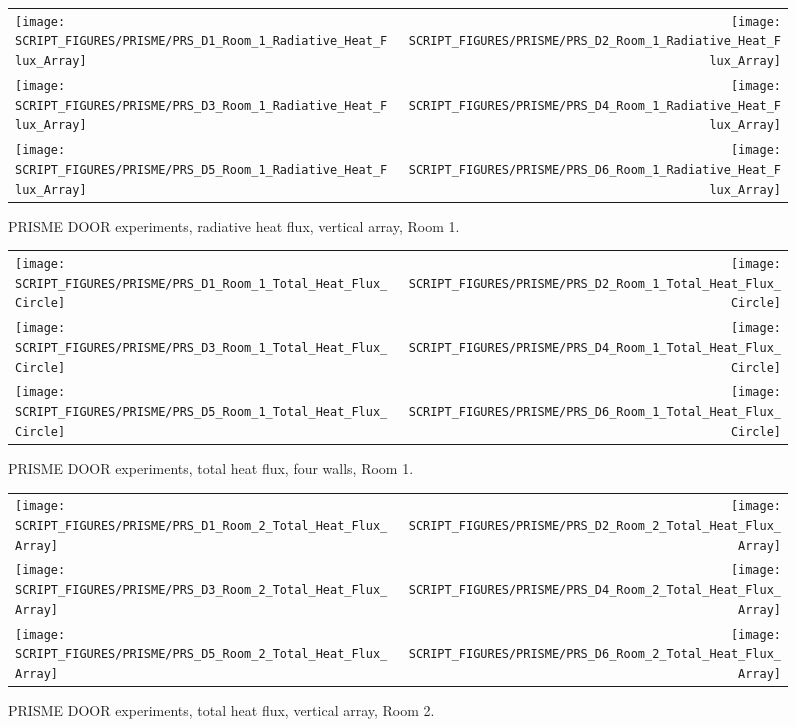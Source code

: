 \newpage

\begin{figure}[p]
\begin{tabular*}{\textwidth}{l@{\extracolsep{\fill}}r}
\texttt{[image: SCRIPT\_FIGURES/PRISME/PRS\_D1\_Room\_1\_Radiative\_Heat\_Flux\_Array]} &
\texttt{[image: SCRIPT\_FIGURES/PRISME/PRS\_D2\_Room\_1\_Radiative\_Heat\_Flux\_Array]} \\
\texttt{[image: SCRIPT\_FIGURES/PRISME/PRS\_D3\_Room\_1\_Radiative\_Heat\_Flux\_Array]} &
\texttt{[image: SCRIPT\_FIGURES/PRISME/PRS\_D4\_Room\_1\_Radiative\_Heat\_Flux\_Array]} \\
\texttt{[image: SCRIPT\_FIGURES/PRISME/PRS\_D5\_Room\_1\_Radiative\_Heat\_Flux\_Array]} &
\texttt{[image: SCRIPT\_FIGURES/PRISME/PRS\_D6\_Room\_1\_Radiative\_Heat\_Flux\_Array]}
\end{tabular*}
\caption{PRISME DOOR experiments, radiative heat flux, vertical array, Room 1.}
\label{PRISME_Wall_Array_RHF_Room_1}
\end{figure}

\begin{figure}[p]
\begin{tabular*}{\textwidth}{l@{\extracolsep{\fill}}r}
\texttt{[image: SCRIPT\_FIGURES/PRISME/PRS\_D1\_Room\_1\_Total\_Heat\_Flux\_Circle]} &
\texttt{[image: SCRIPT\_FIGURES/PRISME/PRS\_D2\_Room\_1\_Total\_Heat\_Flux\_Circle]} \\
\texttt{[image: SCRIPT\_FIGURES/PRISME/PRS\_D3\_Room\_1\_Total\_Heat\_Flux\_Circle]} &
\texttt{[image: SCRIPT\_FIGURES/PRISME/PRS\_D4\_Room\_1\_Total\_Heat\_Flux\_Circle]} \\
\texttt{[image: SCRIPT\_FIGURES/PRISME/PRS\_D5\_Room\_1\_Total\_Heat\_Flux\_Circle]} &
\texttt{[image: SCRIPT\_FIGURES/PRISME/PRS\_D6\_Room\_1\_Total\_Heat\_Flux\_Circle]}
\end{tabular*}
\caption{PRISME DOOR experiments, total heat flux, four walls, Room 1.}
\label{PRISME_Wall_Circle_THF_Room_1}
\end{figure}

\begin{figure}[p]
\begin{tabular*}{\textwidth}{l@{\extracolsep{\fill}}r}
\texttt{[image: SCRIPT\_FIGURES/PRISME/PRS\_D1\_Room\_2\_Total\_Heat\_Flux\_Array]} &
\texttt{[image: SCRIPT\_FIGURES/PRISME/PRS\_D2\_Room\_2\_Total\_Heat\_Flux\_Array]} \\
\texttt{[image: SCRIPT\_FIGURES/PRISME/PRS\_D3\_Room\_2\_Total\_Heat\_Flux\_Array]} &
\texttt{[image: SCRIPT\_FIGURES/PRISME/PRS\_D4\_Room\_2\_Total\_Heat\_Flux\_Array]} \\
\texttt{[image: SCRIPT\_FIGURES/PRISME/PRS\_D5\_Room\_2\_Total\_Heat\_Flux\_Array]} &
\texttt{[image: SCRIPT\_FIGURES/PRISME/PRS\_D6\_Room\_2\_Total\_Heat\_Flux\_Array]}
\end{tabular*}
\caption{PRISME DOOR experiments, total heat flux, vertical array, Room 2.}
\label{PRISME_Wall_Array_THF_Room_2}
\end{figure}

